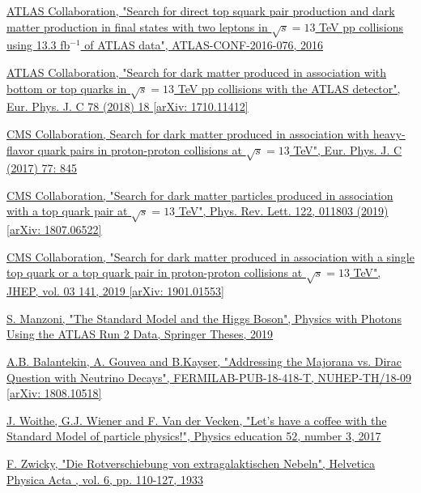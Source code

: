 \documentclass[a4paper, 10pt, openright]{report}
\begin{document}
\begin{thebibliography}{1}
\href{http://inspirehep.net/record/1480056}{ATLAS Collaboration,
"Search for direct top squark pair production and dark matter production in final states with two leptons in $\sqrt{s} = 13$ TeV pp collisions using 13.3 fb$^{-1}$ of ATLAS data",
ATLAS-CONF-2016-076, 2016}

\href{https://arxiv.org/abs/1710.11412}{ATLAS Collaboration,
"Search for dark matter produced in association with bottom or top quarks in $\sqrt{s} = 13$ TeV pp collisions with the ATLAS detector",
Eur. Phys. J. C 78 (2018) 18 [arXiv: 1710.11412]}

\href{http://inspirehep.net/record/1603635}{CMS Collaboration,
Search for dark matter produced in association with heavy-flavor quark pairs in proton-proton collisions at $\sqrt{s} = 13$ TeV",
Eur. Phys. J. C (2017) 77: 845}

\href{https://arxiv.org/abs/1807.06522}{CMS Collaboration,
"Search for dark matter particles produced in association with a top quark pair at $\sqrt{s} = 13$ TeV",
Phys. Rev. Lett. 122, 011803 (2019) [arXiv: 1807.06522]}

\href{https://arxiv.org/abs/1901.01553}{CMS Collaboration,
"Search for dark matter produced in association with a single top quark or a top quark pair in proton-proton collisions at $\sqrt{s} = 13$ TeV",
JHEP, vol. 03 141, 2019 [arXiv: 1901.01553]}

\href{https://link.springer.com/chapter/10.1007/978-3-030-24370-8_2#citeas}{S. Manzoni, 
"The Standard Model and the Higgs Boson",
Physics with Photons Using the ATLAS Run 2 Data, Springer Theses, 2019
}

\href{https://arxiv.org/abs/1808.10518}{A.B. Balantekin, A. Gouvea and B.Kayser,
"Addressing the Majorana vs. Dirac Question with Neutrino Decays",
FERMILAB-PUB-18-418-T, NUHEP-TH/18-09 [arXiv: 1808.10518]
}

\href{https://arxiv.org/abs/1808.10518}{J. Woithe, G.J. Wiener and F. Van der Vecken,
"Let's have a coffee with the Standard Model of particle physics!",
Physics education 52, number 3, 2017
}

\href{http://articles.adsabs.harvard.edu/cgi-bin/nph-iarticle_query?1933AcHPh...6..110Z&amp;data_type=PDF_HIGH&amp;whole_paper=YES&amp;type=PRINTER&amp;filetype=.pdf}{
F. Zwicky,
"Die Rotverschiebung von extragalaktischen Nebeln",
Helvetica Physica Acta , vol. 6, pp. 110-127, 1933}


\end{thebibliography}
\end{document}
